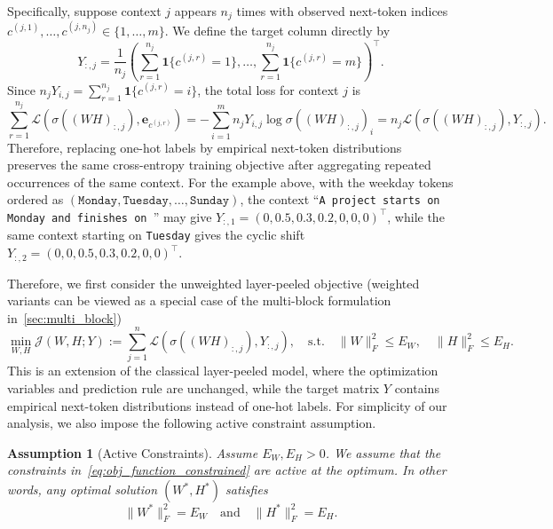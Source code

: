 \documentclass[11pt]{article}
\newtheorem{assumption}{Assumption}
\begin{document}
Specifically, suppose context \(j\) appears \(n_j\) times with observed next-token indices \(c^{(j,1)},\dots,c^{(j,n_j)}\in\{1,\dots,m\}\). We define the target column directly by
\[
Y_{:,j}
=
\frac{1}{n_j}
\left(
\sum_{r=1}^{n_j}\mathbf 1\{c^{(j,r)}=1\},
\dots,
\sum_{r=1}^{n_j}\mathbf 1\{c^{(j,r)}=m\}
\right)^\top.
\]
Since \(n_jY_{i,j}=\sum_{r=1}^{n_j}\mathbf 1\{c^{(j,r)}=i\}\), the total loss for context \(j\) is
\[
\sum_{r=1}^{n_j}
\mathcal L\left(\sigma\left((WH)_{:,j}\right),\boldsymbol e_{c^{(j,r)}}\right)
=
-\sum_{i=1}^{m} n_jY_{i,j}\log \sigma\left((WH)_{:,j}\right)_i
=
n_j
\mathcal L\left(\sigma\left((WH)_{:,j}\right),Y_{:,j}\right).
\]
Therefore, replacing one-hot labels by empirical next-token distributions preserves the same cross-entropy training objective after aggregating repeated occurrences of the same context.
For the example above, with the weekday tokens ordered as \((\texttt{Monday},\texttt{Tuesday},\dots,\texttt{Sunday})\), the context ``\texttt{A project starts on Monday and finishes on \textvisiblespace}'' may give \(Y_{:,1}=(0,0.5,0.3,0.2,0,0,0)^\top\), while the same context starting on \texttt{Tuesday} gives the cyclic shift \(Y_{:,2}=(0,0,0.5,0.3,0.2,0,0)^\top\).

Therefore, we first consider the unweighted layer-peeled objective (weighted variants can be viewed as a special case of the multi-block formulation in~\cref{sec:multi_block})
\begin{equation}
\label{eq:obj_function_constrained}
\min_{W,H} \mathcal J(W,H;Y)
:=
\sum_{j=1}^{n}
\mathcal L\left(\sigma\left((WH)_{:,j}\right),Y_{:,j}\right),
\quad
\mathrm{s.t.}\quad
\|W\|_F^2\le E_W,\quad
\|H\|_F^2\le E_H .
\end{equation}
This is an extension of the classical layer-peeled model, where the optimization variables and prediction rule are unchanged, while the target matrix \(Y\) contains empirical next-token distributions instead of one-hot labels. For simplicity of our analysis, we also impose the following active constraint assumption.
\begin{assumption}[Active Constraints]
\label{ass:active_constraint}
Assume \(E_W,E_H>0\). We assume that the constraints in~\cref{eq:obj_function_constrained} are active at the optimum. In other words, any optimal solution \((W^*,H^*)\) satisfies
\[
\|W^*\|_F^2=E_W
\quad\text{and}\quad
\|H^*\|_F^2=E_H .
\]
\end{assumption}
\end{document}
